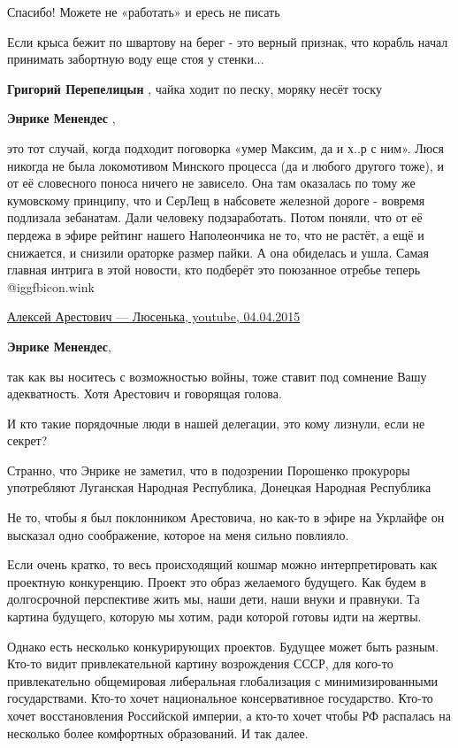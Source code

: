 \begin{itemize}
Спасибо! Можете не «работать» и ересь не писать


Если крыса бежит по швартову на берег - это верный признак, что корабль начал
принимать забортную воду еще стоя у стенки...

\textbf{Григорий Перепелицын} , чайка ходит по песку, моряку несёт тоску

\textbf{Энрике Менендес} , 

это тот случай, когда подходит поговорка «умер Максим, да и х..р с ним». Люся
никогда не была локомотивом Минского процесса (да и любого другого тоже), и от
её словесного поноса ничего не зависело. Она там оказалась по тому же
кумовскому принципу, что и СерЛещ в набсовете железной дороге - вовремя
подлизала зебанатам. Дали человеку подзаработать. Потом поняли, что от её
пердежа в эфире рейтинг нашего Наполеончика не то, что не растёт, а ещё и
снижается, и снизили ораторке размер пайки. А она обиделась и ушла. Самая
главная интрига в этой новости, кто подберёт это поюзанное отребье теперь  @igg{fbicon.wink} 

\href{https://youtu.be/UOBggWPw7GY}{%
Алексей Арестович — Люсенька, youtube, 04.04.2015%
}

\textbf{Энрике Менендес}, 

так как вы носитесь с возможностью войны, тоже ставит под сомнение Вашу
адекватность. Хотя Арестович и говорящая голова.

И кто такие порядочные люди в нашей делегации, это кому лизнули, если не
секрет?


Странно, что Энрике не заметил, что в подозрении Порошенко прокуроры
употребляют Луганская Народная Республика, Донецкая Народная Республика


Не то, чтобы я был поклонником Арестовича, но как-то в эфире на Укрлайфе он
высказал одно соображение, которое на меня сильно повлияло.

Если очень кратко, то весь происходящий кошмар можно интерпретировать как
проектную конкуренцию. Проект это образ желаемого будущего. Как будем в
долгосрочной перспективе жить мы, наши дети, наши внуки и правнуки. Та картина
будущего, которую мы хотим, ради которой готовы идти на жертвы.

Однако есть несколько конкурирующих проектов. Будущее может быть разным. Кто-то
видит привлекательной картину возрождения СССР, для кого-то привлекательно
общемировая либеральная глобализация с минимизированными государствами. Кто-то
хочет национальное консервативное государство. Кто-то хочет восстановления
Российской империи, а кто-то хочет чтобы РФ распалась на несколько более
комфортных образований. И так далее.


\end{itemize}
